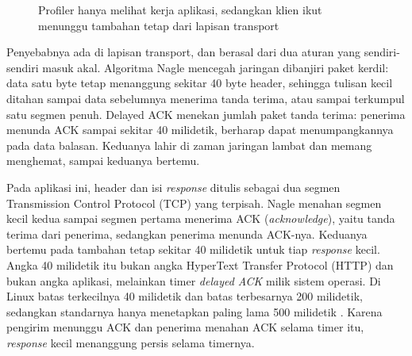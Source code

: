 \begin{figure}[!htb]
  \centering
  \caption{Profiler hanya melihat kerja aplikasi, sedangkan klien ikut
           menunggu tambahan tetap dari lapisan transport}
  \label{fig:nagle}
\end{figure}

Penyebabnya ada di lapisan transport, dan berasal dari dua aturan yang
sendiri-sendiri masuk akal. Algoritma Nagle \cite{rfc896} mencegah jaringan
dibanjiri paket kerdil: data satu byte tetap menanggung sekitar 40 byte
header, sehingga tulisan kecil ditahan sampai data sebelumnya menerima tanda
terima, atau sampai terkumpul satu segmen penuh. Delayed ACK
\cite{rfc1122} menekan jumlah paket tanda terima: penerima menunda ACK sampai
sekitar 40 milidetik, berharap dapat menumpangkannya pada data balasan.
Keduanya lahir di zaman jaringan lambat dan memang menghemat, sampai
keduanya bertemu.

Pada aplikasi ini, header dan isi \textit{response} ditulis sebagai
dua segmen Transmission Control Protocol (TCP) yang terpisah. Nagle menahan segmen
kecil kedua sampai segmen pertama menerima ACK (\textit{acknowledge}),
yaitu tanda terima dari penerima, sedangkan penerima menunda
ACK-nya. Keduanya bertemu pada tambahan tetap sekitar 40 milidetik untuk tiap
\textit{response} kecil. Angka 40 milidetik itu bukan angka HyperText Transfer Protocol (HTTP) dan bukan angka
aplikasi, melainkan timer \textit{delayed ACK} milik sistem operasi. Di Linux
batas terkecilnya 40 milidetik dan batas terbesarnya 200 milidetik, sedangkan
standarnya hanya menetapkan paling lama 500 milidetik \cite{rfc1122}. Karena
pengirim menunggu ACK dan penerima menahan ACK selama timer itu, \textit{response}
kecil menanggung persis selama timernya.

